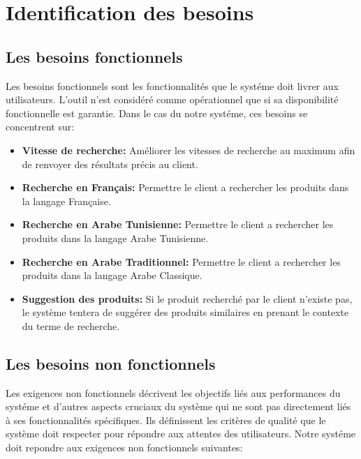 \section{Identification des besoins}
\subsection{Les besoins fonctionnels}
\noindent
Les besoins fonctionnels sont les fonctionnalités que le systéme doit livrer aux utilisateurs.
L’outil n’est considéré comme opérationnel que si sa disponibilité fonctionnelle est garantie.
Dans le cas du notre systéme, ces besoins se concentrent sur:

\begin{itemize}
    \item \small\textbf{Vitesse de recherche: } {Améliorer les vitesses de recherche au maximum afin de renvoyer des résultats précis au client.}
    
    \item \small\textbf{Recherche en Français: } {Permettre le client a rechercher les produits dans la langage Française.}

    \item \small\textbf{Recherche en Arabe Tunisienne: } {Permettre le client a rechercher les produits dans la langage Arabe Tunisienne.}

    \item \small\textbf{Recherche en Arabe Traditionnel: } {Permettre le client a rechercher les produits dans la langage Arabe Classique.}
    
    \item \small\textbf{Suggestion des produits: } {Si le produit recherché par le client n'existe pas, le système tentera de suggérer des produits similaires en prenant le contexte du terme de recherche.}
\end{itemize}

\newpage
\subsection{Les besoins non fonctionnels}
\noindent
Les exigences non fonctionnels décrivent les objectifs liés aux performances du systéme et d'autres aspects cruciaux du système qui ne sont pas directement liés à ses fonctionnalités spécifiques. Ils définissent les critères de qualité que le système doit respecter pour répondre aux attentes des utilisateurs. Notre systéme doit repondre aux exigences non fonctionnels suivantes:

